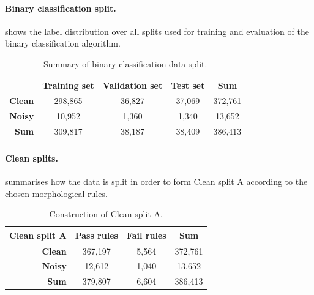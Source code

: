 \documentclass[a4paper,10pt]{article}
\begin{document}
\paragraph{Binary classification split.}  shows the label distribution over all splits used for training and evaluation of the binary classification algorithm.
\begin{table}[htbp]
	\centering
	\begin{tabular}{r|c|c|c|c}
		               & \textbf{Training set} & \textbf{Validation set} & \textbf{Test set} & \textbf{Sum} \\ \midrule
		\textbf{Clean} & 298,865               & 36,827                  & 37,069            & 372,761      \\
		\textbf{Noisy} & 10,952                & 1,360                   & 1,340             & 13,652       \\ \midrule
		\textbf{Sum}   & 309,817               & 38,187                  & 38,409            & 386,413
	\end{tabular}
	\caption{Summary of binary classification data split.}
	\label{tab:binary-data-split}
\end{table}

\paragraph{Clean splits.}  summarises how the data is split in order to form Clean split A according to the chosen morphological rules.
\begin{table}[htbp]
	\centering
	\begin{tabular}{r|c|c|c}
		\textbf{Clean split A} & \textbf{Pass rules} & \textbf{Fail rules} & \textbf{Sum} \\ \midrule
		\textbf{Clean}         & 367,197             & 5,564               & 372,761      \\
		\textbf{Noisy}         & 12,612              & 1,040               & 13,652       \\ \midrule
		\textbf{Sum}           & 379,807             & 6,604               & 386,413
	\end{tabular}
	\caption{Construction of Clean split A.}
	\label{tab:clean-split-a-dist}
\end{table}
\end{document}
